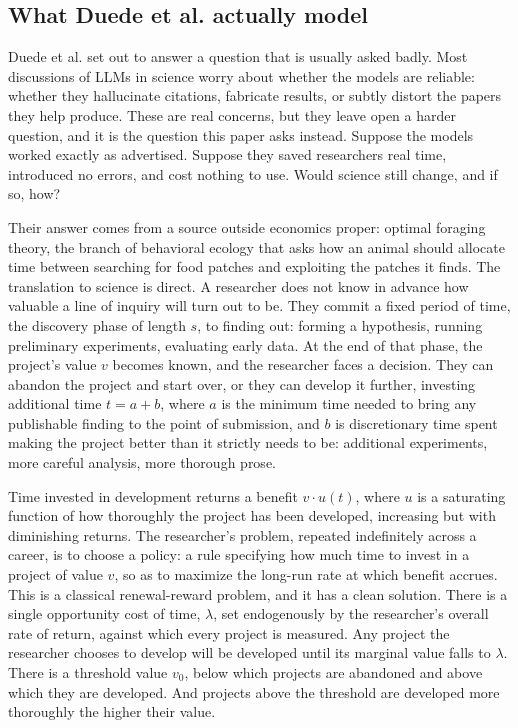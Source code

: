 \documentclass[11pt]{article}
\begin{document}
\subsection{What Duede et al. actually model}

Duede et al. set out to answer a question that is usually asked badly. Most discussions of LLMs in science worry about whether the models are reliable: whether they hallucinate citations, fabricate results, or subtly distort the papers they help produce. These are real concerns, but they leave open a harder question, and it is the question this paper asks instead. Suppose the models worked exactly as advertised. Suppose they saved researchers real time, introduced no errors, and cost nothing to use. Would science still change, and if so, how?

Their answer comes from a source outside economics proper: optimal foraging theory, the branch of behavioral ecology that asks how an animal should allocate time between searching for food patches and exploiting the patches it finds. The translation to science is direct. A researcher does not know in advance how valuable a line of inquiry will turn out to be. They commit a fixed period of time, the discovery phase of length $s$, to finding out: forming a hypothesis, running preliminary experiments, evaluating early data. At the end of that phase, the project's value $v$ becomes known, and the researcher faces a decision. They can abandon the project and start over, or they can develop it further, investing additional time $t = a + b$, where $a$ is the minimum time needed to bring any publishable finding to the point of submission, and $b$ is discretionary time spent making the project better than it strictly needs to be: additional experiments, more careful analysis, more thorough prose.

Time invested in development returns a benefit $v \cdot u(t)$, where $u$ is a saturating function of how thoroughly the project has been developed, increasing but with diminishing returns. The researcher's problem, repeated indefinitely across a career, is to choose a policy: a rule specifying how much time to invest in a project of value $v$, so as to maximize the long-run rate at which benefit accrues. This is a classical renewal-reward problem, and it has a clean solution. There is a single opportunity cost of time, $\lambda$, set endogenously by the researcher's overall rate of return, against which every project is measured. Any project the researcher chooses to develop will be developed until its marginal value falls to $\lambda$. There is a threshold value $v_0$, below which projects are abandoned and above which they are developed. And projects above the threshold are developed more thoroughly the higher their value.
\end{document}

